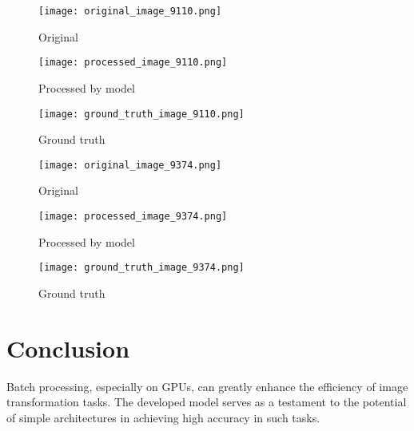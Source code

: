 \documentclass[12pt, a4paper]{article}
\begin{document}
\begin{figure}[ht]
  \centering
  \begin{minipage}[b]{0.3\textwidth}
    \texttt{[image: original\_image\_9110.png]}
    \caption{Original}
    \label{fig:original_9}
  \end{minipage}
  \hfill
  \begin{minipage}[b]{0.3\textwidth}
    \texttt{[image: processed\_image\_9110.png]}
    \caption{Processed by model}
    \label{fig:processed_9}
  \end{minipage}
  \hfill
  \begin{minipage}[b]{0.3\textwidth}
    \texttt{[image: ground\_truth\_image\_9110.png]}
    \caption{Ground truth}
    \label{fig:ground_truth_9}
  \end{minipage}
\end{figure}

\begin{figure}[ht]
  \centering
  \begin{minipage}[b]{0.3\textwidth}
    \texttt{[image: original\_image\_9374.png]}
    \caption{Original}
    \label{fig:original_10}
  \end{minipage}
  \hfill
  \begin{minipage}[b]{0.3\textwidth}
    \texttt{[image: processed\_image\_9374.png]}
    \caption{Processed by model}
    \label{fig:processed_10}
  \end{minipage}
  \hfill
  \begin{minipage}[b]{0.3\textwidth}
    \texttt{[image: ground\_truth\_image\_9374.png]}
    \caption{Ground truth}
    \label{fig:ground_truth_10}
  \end{minipage}
\end{figure}

\FloatBarrier %
\section{Conclusion}
Batch processing, especially on GPUs, can greatly enhance the efficiency of image transformation tasks. The developed model serves as a testament to the potential of simple architectures in achieving high accuracy in such tasks.
\end{document}
